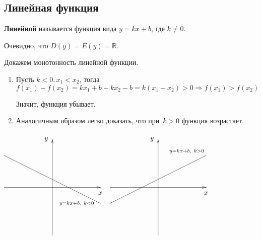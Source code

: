 \subsection{Линейная функция}
 \textbf{Линейной} называется функция вида $y = kx + b$, где $k \neq 0$.

Очевидно, что $D(y) = E(y) = \mathbb R$.

Докажем монотонность линейной функции.
\begin{enumerate}
	\item Пусть $k < 0, x_1 < x_2$, тогда
	\begin{equation*}
	f(x_1) - f(x_2) =
	k x_1 + b - k x_2 - b =
	k(x_1 - x_2) > 0 \Rightarrow
	f(x_1) > f(x_2)
	\end{equation*}
	
	Значит, функция убывает.
	
	\item Аналогичным образом легко доказать, что при~$k > 0$ функция возрастает.
\end{enumerate}

\begin{center}
$\begin{xy} /r8mm/:
(-3, 0); (3, 0) **@{-} *@{>} *++!U{x};
(0, -3); (0, 3) **@{-} *@{>} *++!R{y};
(-3, 2); (3, -1) **@{-} *+++!R{\scriptstyle y = kx + b, \ k < 0};
\end{xy}$
$\begin{xy} /r8mm/:
(-3, 0); (3, 0) **@{-} *@{>} *++!U{x};
(0, -3); (0, 3) **@{-} *@{>} *++!R{y};
(-3, -1); (3, 2) **@{-} *+!DR{\scriptstyle y = kx + b, \ k > 0};
\end{xy}$
\end{center}